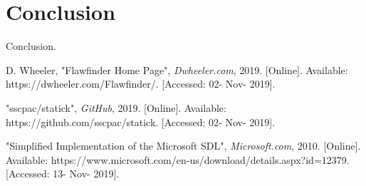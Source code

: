 \documentclass[journal]{IEEEtran}
\begin{document}
\section{Conclusion}
Conclusion.



\begin{thebibliography}{00}

 D. Wheeler, "Flawfinder Home Page", \textit{Dwheeler.com}, 2019. [Online].
Available: https://dwheeler.com/Flawfinder/. [Accessed: 02- Nov- 2019].

 "sscpac/statick", \textit{GitHub}, 2019. [Online]. Available:
https://github.com/sscpac/statick. [Accessed: 02- Nov- 2019].

 "Simplified Implementation of the Microsoft SDL", \textit{Microsoft.com}, 2010.
[Online]. Available: https://www.microsoft.com/en-us/download/details.aspx?id=12379. [Accessed: 13-
Nov- 2019].

\end{thebibliography}
\end{document}
